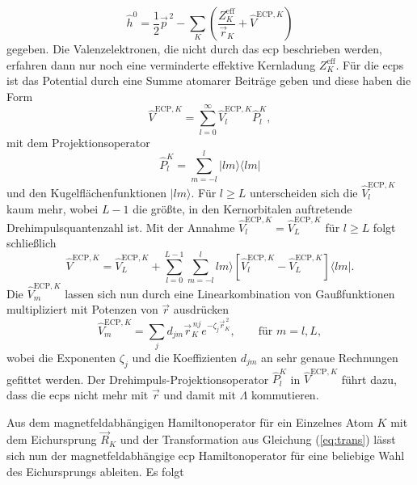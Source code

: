 	\begin{equation}
	\hat{h}^0=\frac{1}{2}\vec{p}^{\,2}-\sum_K \left(\frac{Z_K^{\textrm{eff}}}{\vec{r}_K}+\hat{V}^{\textrm{ECP},K}\right)
	\end{equation}
	gegeben. Die Valenzelektronen, die nicht durch das \ac{ecp} beschrieben werden, erfahren dann nur noch eine verminderte effektive Kernladung $Z_K^{\textrm{eff}}$. Für die \acp{ecp} ist das Potential durch eine Summe atomarer Beiträge geben und diese haben die Form\supercite{mcmurchie1981calculation,cao2010relativistic}
	\begin{equation}\label{eq:ecpotential}
	\hat{V}^{\textrm{ECP},K}=\sum_{l=0}^{\infty}\hat{V}^{\textrm{ECP},K}_l\hat{P}_l^K,
	\end{equation}
	mit dem Projektionsoperator
	\begin{equation}
	\hat{P}_l^K=\sum_{m=-l}^l\vert lm\rangle\langle lm\vert
	\end{equation}
	und den Kugelflächenfunktionen $\vert lm\rangle$. Für $l\geq L$ unterscheiden sich die $\hat{V}^{\textrm{ECP},K}_l$ kaum mehr, wobei $L-1$ die größte, in den Kernorbitalen auftretende Drehimpulsquantenzahl ist. Mit der Annahme $\hat{V}^{\textrm{ECP},K}_l=\hat{V}^{\textrm{ECP},K}_L$ für $l\geq L$ folgt schließlich\supercite{kahn1972ab}
	\begin{equation}
	\hat{V}^{\textrm{ECP},K}=\hat{V}^{\textrm{ECP},K}_{L}+\sum_{l=0}^{L-1}\sum_{m=-l}^l lm\rangle\left[\hat{V}^{\textrm{ECP},K}_{l}-\hat{V}^{\textrm{ECP},K}_{L}\right]\langle lm\vert .
	\end{equation}
	Die $\hat{V}^{\textrm{ECP},K}_{m}$ lassen sich nun durch eine Linearkombination von Gaußfunktionen multipliziert mit Potenzen von $\vec{r}$ ausdrücken\supercite{kahn1972ab}
	\begin{equation}
	\hat{V}^{\textrm{ECP},K}_{m}=\sum_jd_{jm}\vec{r}_K^{\,nj}e^{-\zeta_j\vec{r}_K^{\,2}}, \qquad \textrm{für } m=l,L,
	\end{equation}
	wobei die Exponenten $\zeta_j$ und die Koeffizienten $d_{jm}$ an sehr genaue Rechnungen gefittet werden. Der Drehimpuls-Projektionsoperator $\hat{P}_l^K$ in $\hat{V}^{\textrm{ECP},K}$ führt dazu, dass die \acp{ecp} nicht mehr mit $\vec{r}$ und damit mit $\Lambda$ kommutieren. 
	
	Aus dem magnetfeldabhängigen Hamiltonoperator für ein Einzelnes Atom $K$ mit dem Eichursprung $\vec{R}_K$ und der Transformation aus Gleichung (\ref{eq:trans}) lässt sich nun der magnetfeldabhängige \ac{ecp} Hamiltonoperator für eine beliebige Wahl des Eichursprungs ableiten. Es folgt
	
